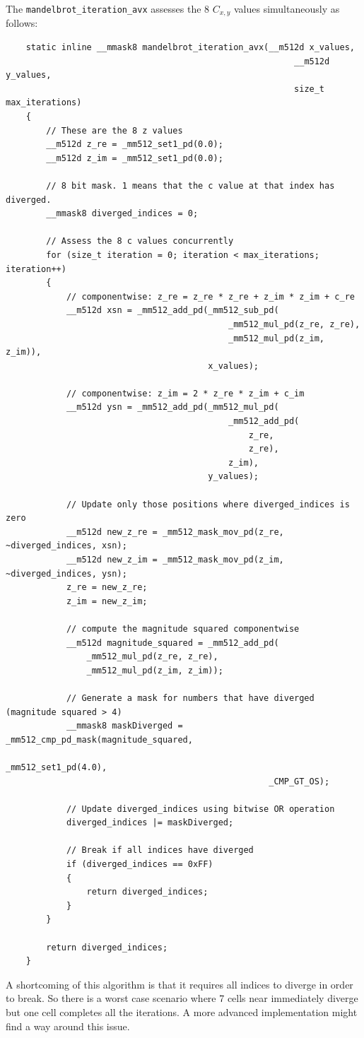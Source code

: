 \documentclass{article}
\begin{document}
\noindent The \texttt{mandelbrot\_iteration\_avx} assesses the 8 $C_{x,y}$ values simultaneously as follows:
\begin{lstlisting}
    static inline __mmask8 mandelbrot_iteration_avx(__m512d x_values,
                                                         __m512d y_values,
                                                         size_t max_iterations)
    {
        // These are the 8 z values
        __m512d z_re = _mm512_set1_pd(0.0);
        __m512d z_im = _mm512_set1_pd(0.0);

        // 8 bit mask. 1 means that the c value at that index has diverged.
        __mmask8 diverged_indices = 0;

        // Assess the 8 c values concurrently
        for (size_t iteration = 0; iteration < max_iterations; iteration++)
        {
            // componentwise: z_re = z_re * z_re + z_im * z_im + c_re
            __m512d xsn = _mm512_add_pd(_mm512_sub_pd(
                                            _mm512_mul_pd(z_re, z_re),
                                            _mm512_mul_pd(z_im, z_im)),
                                        x_values);

            // componentwise: z_im = 2 * z_re * z_im + c_im
            __m512d ysn = _mm512_add_pd(_mm512_mul_pd(
                                            _mm512_add_pd(
                                                z_re,
                                                z_re),
                                            z_im),
                                        y_values);

            // Update only those positions where diverged_indices is zero
            __m512d new_z_re = _mm512_mask_mov_pd(z_re, ~diverged_indices, xsn);
            __m512d new_z_im = _mm512_mask_mov_pd(z_im, ~diverged_indices, ysn);
            z_re = new_z_re;
            z_im = new_z_im;

            // compute the magnitude squared componentwise
            __m512d magnitude_squared = _mm512_add_pd(
                _mm512_mul_pd(z_re, z_re),
                _mm512_mul_pd(z_im, z_im));

            // Generate a mask for numbers that have diverged (magnitude squared > 4)
            __mmask8 maskDiverged = _mm512_cmp_pd_mask(magnitude_squared,
                                                    _mm512_set1_pd(4.0),
                                                    _CMP_GT_OS);

            // Update diverged_indices using bitwise OR operation
            diverged_indices |= maskDiverged;

            // Break if all indices have diverged
            if (diverged_indices == 0xFF)
            {
                return diverged_indices;
            }
        }

        return diverged_indices;
    }
\end{lstlisting}
\noindent A shortcoming of this algorithm is that it requires all indices to diverge 
in order to break. So there is a worst case scenario where 7 cells near immediately 
diverge but one cell completes all the iterations. A more advanced implementation might 
find a way around this issue.
\end{document}
